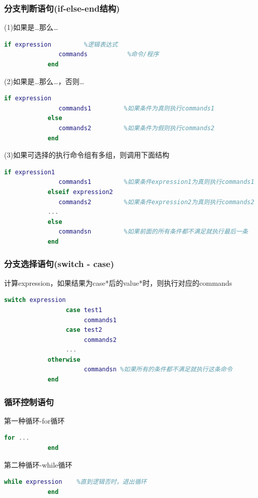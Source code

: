        \subsubsection{分支判断语句(if-else-end结构)}
            \par
            (1)如果是…那么…
             \begin{lstlisting}[language=Matlab]
            if expression         %逻辑表达式
               commands           %命令/程序
            end
            \end{lstlisting}
            \par
            (2)如果是…那么…，否则…
            \begin{lstlisting}[language=Matlab]
            if expression
               commands1         %如果条件为真则执行commands1
            else
               commands2         %如果条件为假则执行commands2
            end
            \end{lstlisting}
            \par
            (3)如果可选择的执行命令组有多组，则调用下面结构
            \begin{lstlisting}[language=Matlab]
            if expression1
               commands1         %如果条件expression1为真则执行commands1
            elseif expression2
               commands2         %如果条件expression2为真则执行commands2
            ...
            else
               commandsn         %如果前面的所有条件都不满足就执行最后一条
            end
                \end{lstlisting}
        \subsubsection{分支选择语句(switch - case)}
            计算expression，如果结果为case*后的value*时，则执行对应的commands
                \begin{lstlisting}[language=Matlab]
            switch expression
                 case test1
                      commands1
                 case test2
                      commands2
                 ...
            otherwise
                      commandsn %如果所有的条件都不满足就执行这条命令
            end
                \end{lstlisting}
        \subsubsection{循环控制语句}
            第一种循环-for循环
                \begin{lstlisting}[language=Matlab]
            for ...
            end
                \end{lstlisting}
            \par
            第二种循环-while循环
                \begin{lstlisting}[language=Matlab]
            while expression    %直到逻辑否时，退出循环
            end
                \end{lstlisting}
